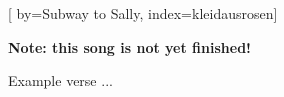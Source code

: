 
[%
    by={Subway to Sally},
    index={kleidausrosen}]


    \label{kleidausrosen}

    \textbf{Note: this song is not yet finished!}

    \beginverse
        Example verse ...
    \endverse
\endsong
